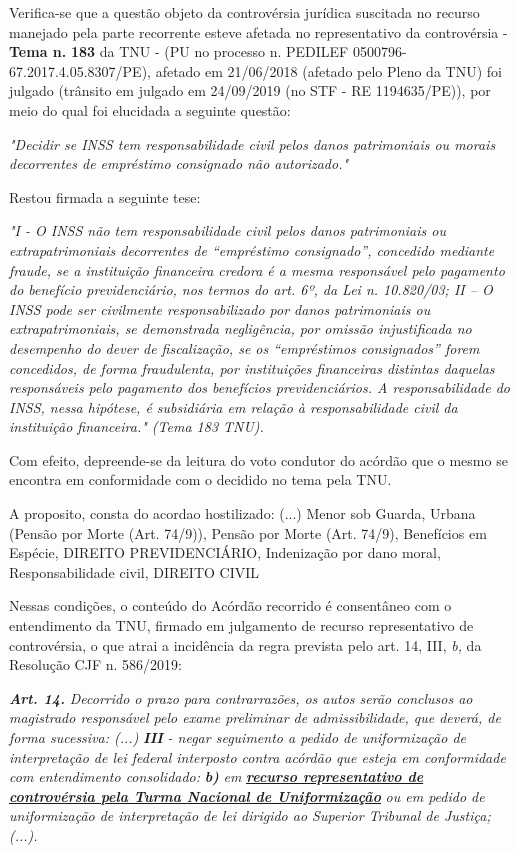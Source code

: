\documentclass[12pt]{article}
\begin{document}
\justifying
\noindent Verifica-se que a questão objeto da controvérsia jurídica suscitada no recurso manejado pela parte recorrente esteve afetada no representativo da controvérsia - \textbf{Tema n. }\textbf{183} da TNU - (PU no processo n. PEDILEF 0500796-67.2017.4.05.8307/PE),  afetado em 21/06/2018 (afetado pelo Pleno da TNU) foi julgado (trânsito em julgado em 24/09/2019 (no STF - RE 1194635/PE)), por meio do qual foi elucidada a seguinte questão:

\noindent \textit{"Decidir se INSS tem responsabilidade civil pelos danos patrimoniais ou morais decorrentes de empréstimo consignado não autorizado."}

\noindent Restou firmada a seguinte tese:

\noindent \textit{"I - O INSS não tem responsabilidade civil pelos danos patrimoniais ou extrapatrimoniais decorrentes de “empréstimo consignado”, concedido mediante fraude, se a instituição financeira credora é a mesma responsável pelo pagamento do benefício previdenciário, nos termos do art. 6º, da Lei n. 10.820/03; II – O INSS pode ser civilmente responsabilizado por danos patrimoniais ou extrapatrimoniais, se demonstrada negligência, por omissão injustificada no desempenho do dever de fiscalização, se os “empréstimos consignados” forem concedidos, de forma fraudulenta, por instituições financeiras distintas daquelas responsáveis pelo pagamento dos benefícios previdenciários. A responsabilidade do INSS, nessa hipótese, é subsidiária em relação à responsabilidade civil da instituição financeira." (Tema 183 TNU).}

\noindent Com efeito, depreende-se da leitura do voto condutor do acórdão que o mesmo se encontra em conformidade com o decidido no  tema pela TNU.

\noindent A proposito, consta do acordao hostilizado: (...) Menor sob Guarda, Urbana (Pensão por Morte (Art. 74/9)), Pensão por Morte (Art. 74/9), Benefícios em Espécie, DIREITO PREVIDENCIÁRIO, Indenização por dano moral, Responsabilidade civil, DIREITO CIVIL

\noindent Nessas condições, o conteúdo do Acórdão recorrido é consentâneo com o entendimento da TNU, firmado em julgamento de recurso representativo de controvérsia, o que atrai a incidência da regra prevista pelo art. 14, III, \textit{b,} da Resolução CJF n. 586/2019:

\noindent \textit{\textbf{Art. 14.}}\textit{ Decorrido o prazo para contrarrazões, os autos serão conclusos ao magistrado responsável pelo exame preliminar de admissibilidade, que deverá, de forma sucessiva: (...) }\textit{\textbf{III }}\textit{- negar seguimento a pedido de uniformização de interpretação de lei federal interposto contra acórdão que esteja em conformidade com entendimento consolidado: }\textit{\textbf{b)}}\textit{ em }\uline{\textit{\textbf{recurso representativo de controvérsia pela Turma Nacional de Uniformização}}}\textit{ ou em pedido de uniformização de interpretação de lei dirigido ao Superior Tribunal de Justiça;(...).}
\end{document}
